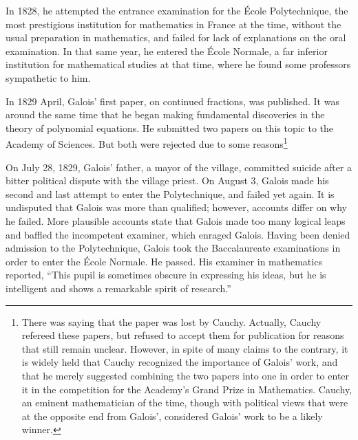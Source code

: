 \documentclass{article}
\begin{document}
In 1828, he attempted the entrance examination for the École Polytechnique, the most prestigious institution for mathematics in France at the time, without the usual preparation in mathematics, and failed for lack of explanations on the oral examination. In that same year, he entered the École Normale, a far inferior institution for mathematical studies at that time, where he found some professors sympathetic to him.

In 1829 April, Galois' first paper, on continued fractions, was published. It was around the same time that he began making fundamental discoveries in the theory of polynomial equations. He submitted two papers on this topic to the Academy of Sciences. But both were rejected due to some reasons\footnote{There was saying that the paper was lost by Cauchy. Actually, Cauchy refereed these papers, but refused to accept them for publication for reasons that still remain unclear. However, in spite of many claims to the contrary, it is widely held that Cauchy recognized the importance of Galois' work, and that he merely suggested combining the two papers into one in order to enter it in the competition for the Academy's Grand Prize in Mathematics. Cauchy, an eminent mathematician of the time, though with political views that were at the opposite end from Galois', considered Galois' work to be a likely winner\cite{Wiki-Galois}.}

On July 28, 1829, Galois' father, a mayor of the village, committed suicide after a bitter political dispute with the village priest\cite{Wiki-Galois}. On August 3, Galois made his second and last attempt to enter the Polytechnique, and failed yet again. It is undisputed that Galois was more than qualified; however, accounts differ on why he failed. More plausible accounts state that Galois made too many logical leaps and baffled the incompetent examiner, which enraged Galois. Having been denied admission to the Polytechnique, Galois took the Baccalaureate examinations in order to enter the École Normale. He passed. His examiner in mathematics reported, ``This pupil is sometimes obscure in expressing his ideas, but he is intelligent and shows a remarkable spirit of research.''
\end{document}
